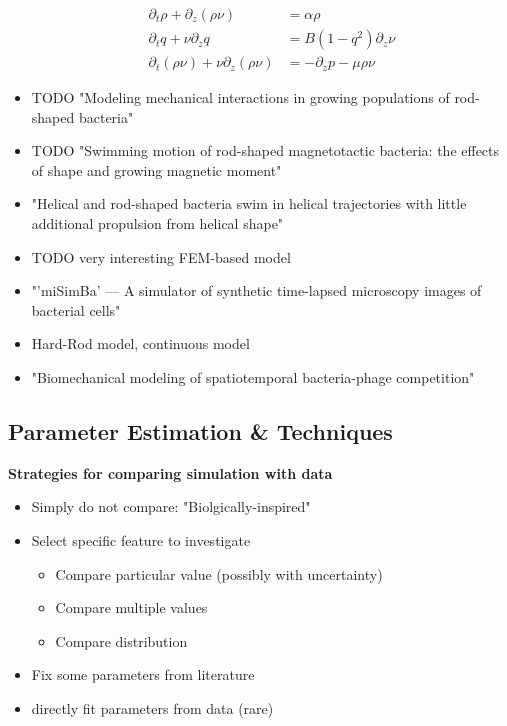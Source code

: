 \documentclass{article}
\begin{document}
\begin{itemize}
    \begin{align}
        \partial_t \rho + \partial_z (\rho \nu) &= \alpha \rho\\
        \partial_t q + \nu \partial_z q &= B(1-q^2) \partial_z \nu\\
        \partial_t(\rho \nu) + \nu \partial_z (\rho \nu) &= - \partial_z p - \mu \rho \nu
    \end{align}
    \item \cite{Pleyer2023} TODO "Modeling mechanical interactions in growing populations of
        rod-shaped bacteria"
    \item \cite{Kong2014} TODO "Swimming motion of rod-shaped magnetotactic bacteria: the effects of
        shape and growing magnetic moment"
    \item \cite{Constantino2016} "Helical and rod-shaped bacteria swim in helical trajectories with
        little additional propulsion from helical shape"
    \item \cite{Starru2007} TODO very interesting FEM-based model
    \item \cite{Martins2015} "'miSimBa' — A simulator of synthetic time-lapsed microscopy images of
        bacterial cells"
    \item \cite{You2018} Hard-Rod model, continuous model
    \item \cite{Valdez2025} "Biomechanical modeling of spatiotemporal bacteria-phage competition"
\end{itemize}

\subsection{Parameter Estimation \& Techniques}

\textbf{Strategies for comparing simulation with data}
\begin{itemize}
    \item Simply do not compare: "Biolgically-inspired"
    \item Select specific feature to investigate
    \begin{itemize}
        \item Compare particular value (possibly with uncertainty)
        \item Compare multiple values
        \item Compare distribution
    \end{itemize}
    \item Fix some parameters from literature
    \item directly fit parameters from data (rare)
\end{itemize}
\end{document}
